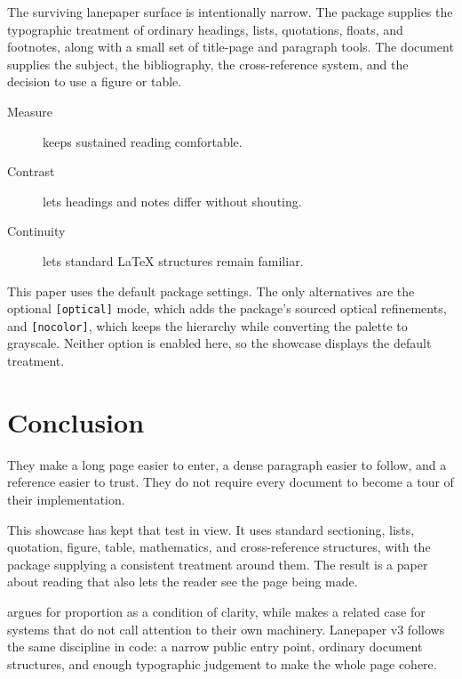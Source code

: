 \documentclass[11pt]{article}
\begin{document}
The surviving lanepaper surface is intentionally narrow.
The package supplies the typographic treatment of ordinary headings, lists,
quotations, floats, and footnotes, along with a small set of title-page and
paragraph tools.
The document supplies the subject, the bibliography, the cross-reference
system, and the decision to use a figure or table.

\begin{description}
  \item[Measure] keeps sustained reading comfortable.
  \item[Contrast] lets headings and notes differ without shouting.
  \item[Continuity] lets standard LaTeX structures remain familiar.
\end{description}

This paper uses the default package settings.
The only alternatives are the optional \texttt{[optical]} mode, which adds
the package's sourced optical refinements, and \texttt{[nocolor]}, which
keeps the hierarchy while converting the palette to grayscale.
Neither option is enabled here, so the showcase displays the default treatment.

\section{Conclusion}
\label{sec:conclusion}

They make a long page easier to enter, a dense paragraph easier to follow, and
a reference easier to trust.
They do not require every document to become a tour of their implementation.

This showcase has kept that test in view.
It uses standard sectioning, lists, quotation, figure, table, mathematics, and
cross-reference structures, with the package supplying a consistent treatment
around them.
The result is a paper about reading that also lets the reader see the page being
made.

\textcite{bringhurst2012elements} argues for proportion as a condition of
clarity, while \textcite{brown2018flexible} makes a related case for systems
that do not call attention to their own machinery.
Lanepaper v3 follows the same discipline in code: a narrow public entry point,
ordinary document structures, and enough typographic judgement to make the
whole page cohere.

\printbibliography
\end{document}
